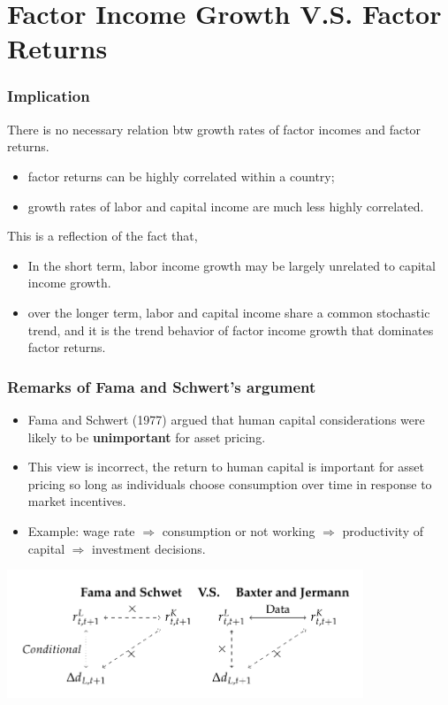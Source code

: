 \documentclass[10pt]{beamer}
\begin{document}
\section[Income V.S. Returns]{Factor Income Growth V.S. Factor Returns}
\begin{frame}[c]\frametitle{Implication}
There is \alert{no necessary relation} btw \alert{growth rates of factor incomes} and \alert{factor returns}.
\begin{itemize}
    \item factor returns can be highly correlated within a country;
    \item growth rates of labor and capital income are much less highly correlated.
\end{itemize}
This is a reflection of the fact that,
\begin{itemize}
    \item In the short term, labor income growth may be largely unrelated to capital income growth.
    \item over the longer term, labor and capital income \alert{share a common stochastic trend}, and it is the trend behavior of factor income growth that dominates factor returns.
\end{itemize}


\end{frame}


\begin{frame}[c]\frametitle{Remarks of Fama and Schwert's argument}
\begin{itemize}
    \item Fama and Schwert (1977) argued that \alert{human capital considerations} were likely to be \textbf{unimportant} for \alert{asset pricing}.
    \item This view is incorrect, the return to human capital is important for asset pricing so long as individuals choose consumption over time in response to market incentives.
   \item Example: wage rate $\Rightarrow$ consumption or not working $\Rightarrow$ productivity of capital $\Rightarrow$ investment decisions.
\end{itemize}
\centerline{\includegraphics[width=0.8\textwidth]{argu.png}}

\end{frame}
\end{document}

